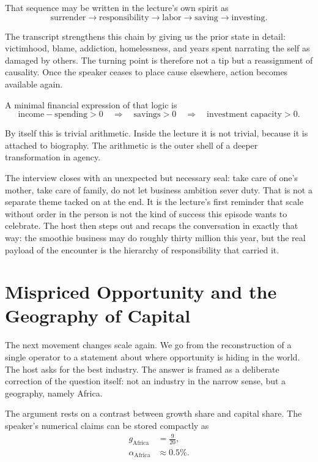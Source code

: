 That sequence may be written in the lecture's own spirit as
\begin{equation}
\text{surrender}
\to
\text{responsibility}
\to
\text{labor}
\to
\text{saving}
\to
\text{investing}.
\end{equation}

The transcript strengthens this chain by giving us the prior state in detail: victimhood, blame, addiction, homelessness, and years spent narrating the self as damaged by others. The turning point is therefore not a tip but a reassignment of causality. Once the speaker ceases to place cause elsewhere, action becomes available again.

A minimal financial expression of that logic is
\begin{equation}
\text{income}-\text{spending}>0
\quad\Longrightarrow\quad
\text{savings}>0
\quad\Longrightarrow\quad
\text{investment capacity}>0.
\end{equation}

By itself this is trivial arithmetic. Inside the lecture it is not trivial, because it is attached to biography. The arithmetic is the outer shell of a deeper transformation in agency.

The interview closes with an unexpected but necessary seal: take care of one's mother, take care of family, do not let business ambition sever duty. That is not a separate theme tacked on at the end. It is the lecture's first reminder that scale without order in the person is not the kind of success this episode wants to celebrate. The host then steps out and recaps the conversation in exactly that way: the smoothie business may do roughly thirty million this year, but the real payload of the encounter is the hierarchy of responsibility that carried it.

\section{Mispriced Opportunity and the Geography of Capital}

The next movement changes scale again. We go from the reconstruction of a single operator to a statement about where opportunity is hiding in the world. The host asks for the best industry. The answer is framed as a deliberate correction of the question itself: not an industry in the narrow sense, but a geography, namely Africa.

The argument rests on a contrast between growth share and capital share. The speaker's numerical claims can be stored compactly as
\begin{align}
g_{\mathrm{Africa}} &= \frac{9}{20},\\
\alpha_{\mathrm{Africa}} &\approx 0.5\%.
\end{align}

